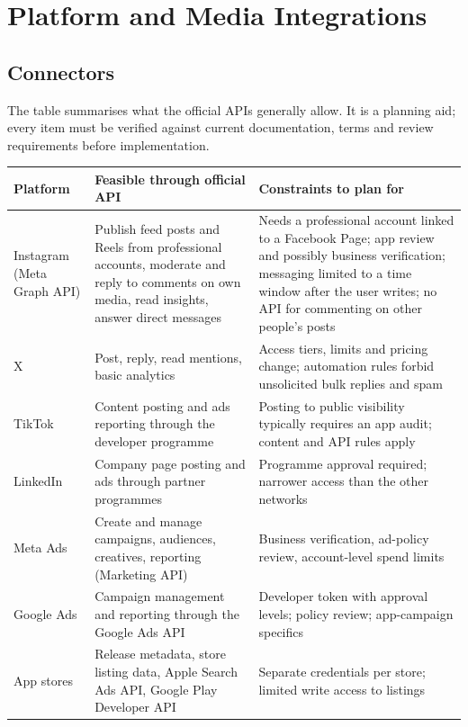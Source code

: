 \documentclass[11pt,a4paper]{article}
\begin{document}
\section{Platform and Media Integrations}

\subsection{Connectors}
The table summarises what the official APIs generally allow. It is a planning aid; every item must be verified against current documentation, terms and review requirements before implementation.

\begin{longtable}{@{}p{2.6cm}p{6.1cm}p{6.6cm}@{}}
\toprule
\textbf{Platform} & \textbf{Feasible through official API} & \textbf{Constraints to plan for}\\
\midrule
\endhead
Instagram (Meta Graph API) & Publish feed posts and Reels from professional accounts, moderate and reply to comments on own media, read insights, answer direct messages & Needs a professional account linked to a Facebook Page; app review and possibly business verification; messaging limited to a time window after the user writes; no API for commenting on other people's posts\\
X & Post, reply, read mentions, basic analytics & Access tiers, limits and pricing change; automation rules forbid unsolicited bulk replies and spam\\
TikTok & Content posting and ads reporting through the developer programme & Posting to public visibility typically requires an app audit; content and API rules apply\\
LinkedIn & Company page posting and ads through partner programmes & Programme approval required; narrower access than the other networks\\
Meta Ads & Create and manage campaigns, audiences, creatives, reporting (Marketing API) & Business verification, ad-policy review, account-level spend limits\\
Google Ads & Campaign management and reporting through the Google Ads API & Developer token with approval levels; policy review; app-campaign specifics\\
App stores & Release metadata, store listing data, Apple Search Ads API, Google Play Developer API & Separate credentials per store; limited write access to listings\\
\bottomrule
\end{longtable}
\end{document}

